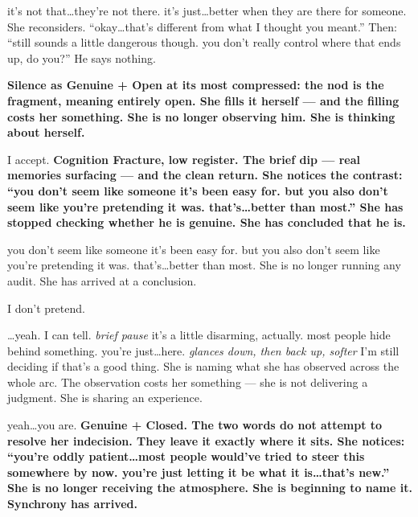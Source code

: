 {it's not that\ldots they're not there. it's just\ldots better when they 
are there for someone.}
{She reconsiders. ``okay\ldots that's different from what I thought you meant.'' 
Then: ``still sounds a little dangerous though. you don't really control where 
that ends up, do you?'' He says nothing.}

{\textbf{Silence as Genuine + Open at its most compressed: the nod is the 
fragment, meaning entirely open. She fills it herself --- and the filling costs 
her something. She is no longer observing him. She is thinking about herself.}}

\thinrule

{I accept.}
{\textbf{Cognition Fracture, low register. The brief dip --- real memories 
surfacing --- and the clean return. She notices the contrast: ``you don't seem 
like someone it's been easy for. but you also don't seem like you're pretending 
it was. that's\ldots better than most.'' She has stopped checking whether he is 
genuine. She has concluded that he is.}}

{you don't seem like someone it's been easy for. but you also don't seem like 
you're pretending it was. that's\ldots better than most.}
{She is no longer running any audit. She has arrived at a conclusion.}

\thinrule

{I don't pretend.}
{}

{\ldots yeah. I can tell. \textit{brief pause} it's a little disarming, 
actually. most people hide behind something. you're just\ldots here. 
\textit{glances down, then back up, softer} I'm still deciding if that's 
a good thing.}
{She is naming what she has observed across the whole arc. The observation 
costs her something --- she is not delivering a judgment. She is sharing 
an experience.}

{yeah\ldots you are.}
{\textbf{Genuine + Closed. The two words do not attempt to resolve her 
indecision. They leave it exactly where it sits. She notices: ``you're oddly 
patient\ldots most people would've tried to steer this somewhere by now. 
you're just letting it be what it is\ldots that's new.'' 
She is no longer receiving the atmosphere. She is beginning to name it. 
Synchrony has arrived.}}

